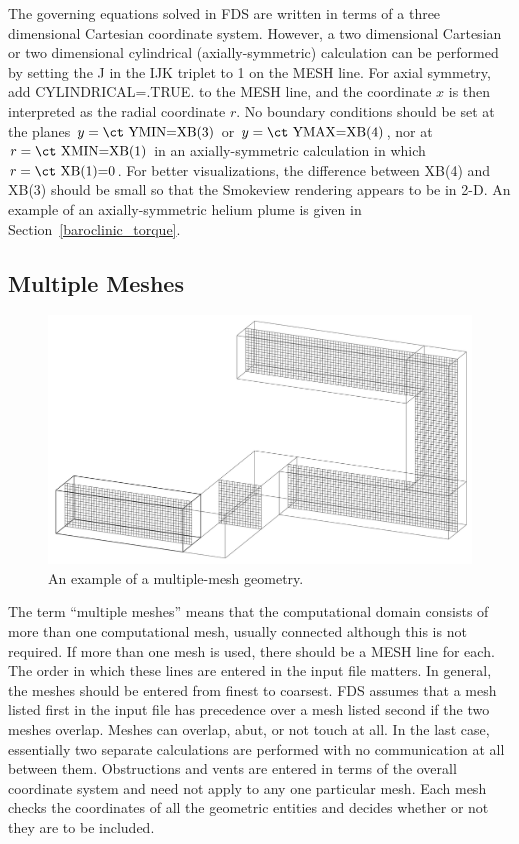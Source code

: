 \documentclass[11pt]{book}
\begin{document}
The governing equations solved in FDS are written in terms of a three dimensional Cartesian coordinate system. However, a two dimensional Cartesian or two dimensional cylindrical (axially-symmetric) calculation can be performed by setting the {\ct J} in the {\ct IJK} triplet to 1 on the {\ct MESH} line. For axial symmetry, add {\ct CYLINDRICAL=.TRUE.} to the {\ct MESH} line, and the coordinate $x$ is then interpreted as the radial coordinate $r$. No boundary conditions should be set at the planes $y=\hbox{\ct YMIN=XB(3)}$ or $y=\hbox{\ct YMAX=XB(4)}$, nor at $r=\hbox{\ct XMIN=XB(1)}$ in an axially-symmetric calculation in which $r=\hbox{\ct XB(1)=0}$. For better visualizations, the difference between {\ct XB(4)} and {\ct XB(3)} should be small so that the Smokeview rendering appears to be in 2-D. An example of an axially-symmetric helium plume is given in Section~\ref{baroclinic_torque}.


\subsection{Multiple Meshes}
\label{info:multimesh}

\begin{figure}[ht!]
\includegraphics[width=\textwidth]{FIGURES/hallways}
\caption{An example of a multiple-mesh geometry.}
\label{fig:domain}
\end{figure}

The term ``multiple meshes'' means that the computational domain consists of more than one computational mesh, usually connected although this is not required. If more than one mesh is used, there should be a {\ct MESH} line for each. The order in which these lines are entered in the input file matters. In general, the meshes should be entered from finest to coarsest. FDS assumes that a mesh listed first in the input file has precedence over a mesh listed second if the two meshes overlap. Meshes can overlap, abut, or not touch at all. In the last case, essentially two separate calculations are performed with no communication at all between them. Obstructions and vents are entered in terms of the overall coordinate system and need not apply to any one particular mesh. Each mesh checks the coordinates of all the geometric entities and decides whether or not they are to be included.
\end{document}
